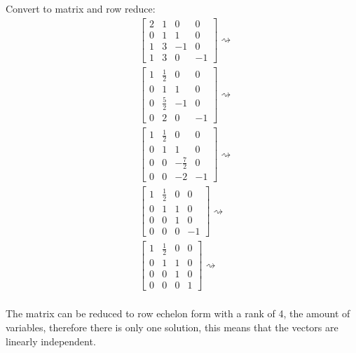 Convert to matrix and row reduce:
\begin{align*}
	 & \begin{bmatrix}
		   2 & 1 & 0  & 0  \\
		   0 & 1 & 1  & 0  \\
		   1 & 3 & -1 & 0  \\
		   1 & 3 & 0  & -1
	   \end{bmatrix} \rightsquigarrow      \\
	 & \begin{bmatrix}
		   1 & \frac{1}{2} & 0  & 0  \\
		   0 & 1           & 1  & 0  \\
		   0 & \frac{5}{2} & -1 & 0  \\
		   0 & 2           & 0  & -1
	   \end{bmatrix} \rightsquigarrow      \\
	 & \begin{bmatrix}
		   1 & \frac{1}{2} & 0            & 0  \\
		   0 & 1           & 1            & 0  \\
		   0 & 0           & -\frac{7}{2} & 0  \\
		   0 & 0           & -2           & -1
	   \end{bmatrix} \rightsquigarrow \\
	 & \begin{bmatrix}
		   1 & \frac{1}{2} & 0 & 0  \\
		   0 & 1           & 1 & 0  \\
		   0 & 0           & 1 & 0  \\
		   0 & 0           & 0 & -1
	   \end{bmatrix} \rightsquigarrow      \\
	 & \begin{bmatrix}
		   1 & \frac{1}{2} & 0 & 0 \\
		   0 & 1           & 1 & 0 \\
		   0 & 0           & 1 & 0 \\
		   0 & 0           & 0 & 1
	   \end{bmatrix} \rightsquigarrow      \\
\end{align*}

The matrix can be reduced to row echelon form with a rank of 4, the amount of variables, therefore there is only one solution, this means that the vectors are linearly independent.

